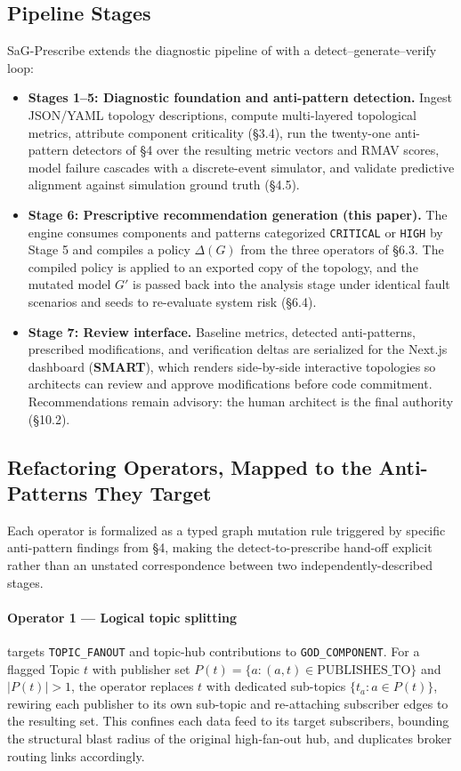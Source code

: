 \documentclass[11pt]{article}
\begin{document}
\subsection{Pipeline Stages}

SaG-Prescribe extends the diagnostic pipeline of \cite{SaG} with a detect--generate--verify loop:

\begin{itemize}
\item \textbf{Stages 1--5: Diagnostic foundation and anti-pattern detection.} Ingest JSON/YAML
  topology descriptions, compute multi-layered topological metrics, attribute component criticality
  (\S3.4), run the twenty-one anti-pattern detectors of \S4 over the resulting metric vectors and RMAV
  scores, model failure cascades with a discrete-event simulator, and validate predictive alignment
  against simulation ground truth (\S4.5).
\item \textbf{Stage 6: Prescriptive recommendation generation (this paper).} The engine consumes
  components and patterns categorized \texttt{CRITICAL} or \texttt{HIGH} by Stage 5 and compiles a
  policy $\Delta(G)$ from the three operators of \S6.3. The compiled policy is applied to an exported
  copy of the topology, and the mutated model $G'$ is passed back into the analysis stage under
  identical fault scenarios and seeds to re-evaluate system risk (\S6.4).
\item \textbf{Stage 7: Review interface.} Baseline metrics, detected anti-patterns, prescribed
  modifications, and verification deltas are serialized for the Next.js dashboard (\textbf{SMART}),
  which renders side-by-side interactive topologies so architects can review and approve modifications
  before code commitment. Recommendations remain advisory: the human architect is the final authority
  (\S10.2).
\end{itemize}

\subsection{Refactoring Operators, Mapped to the Anti-Patterns They Target}

Each operator is formalized as a typed graph mutation rule triggered by specific anti-pattern findings
from \S4, making the detect-to-prescribe hand-off explicit rather than an unstated correspondence
between two independently-described stages.

\paragraph{Operator 1 --- Logical topic splitting} targets \texttt{TOPIC\_FANOUT} and topic-hub
contributions to \texttt{GOD\_COMPONENT}. For a flagged Topic $t$ with publisher set $P(t) = \{a : (a,
t) \in \text{PUBLISHES\_TO}\}$ and $|P(t)| > 1$, the operator replaces $t$ with dedicated sub-topics
$\{t_a : a \in P(t)\}$, rewiring each publisher to its own sub-topic and re-attaching subscriber edges
to the resulting set. This confines each data feed to its target subscribers, bounding the structural
blast radius of the original high-fan-out hub, and duplicates broker routing links accordingly.
\end{document}
